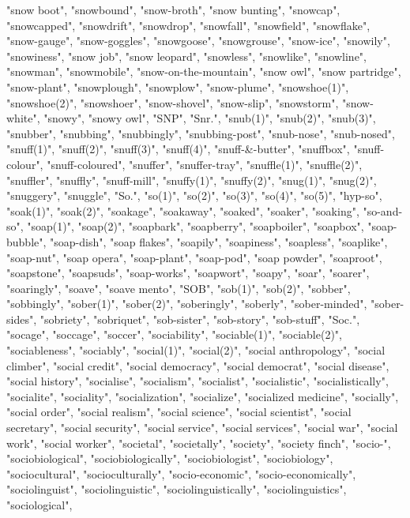 "snow boot",
"snowbound",
"snow-broth",
"snow bunting",
"snowcap",
"snowcapped",
"snowdrift",
"snowdrop",
"snowfall",
"snowfield",
"snowflake",
"snow-gauge",
"snow-goggles",
"snowgoose",
"snowgrouse",
"snow-ice",
"snowily",
"snowiness",
"snow job",
"snow leopard",
"snowless",
"snowlike",
"snowline",
"snowman",
"snowmobile",
"snow-on-the-mountain",
"snow owl",
"snow partridge",
"snow-plant",
"snowplough",
"snowplow",
"snow-plume",
"snowshoe(1)",
"snowshoe(2)",
"snowshoer",
"snow-shovel",
"snow-slip",
"snowstorm",
"snow-white",
"snowy",
"snowy owl",
"SNP",
"Snr.",
"snub(1)",
"snub(2)",
"snub(3)",
"snubber",
"snubbing",
"snubbingly",
"snubbing-post",
"snub-nose",
"snub-nosed",
"snuff(1)",
"snuff(2)",
"snuff(3)",
"snuff(4)",
"snuff-\&-butter",
"snuffbox",
"snuff-colour",
"snuff-coloured",
"snuffer",
"snuffer-tray",
"snuffle(1)",
"snuffle(2)",
"snuffler",
"snuffly",
"snuff-mill",
"snuffy(1)",
"snuffy(2)",
"snug(1)",
"snug(2)",
"snuggery",
"snuggle",
"So.",
"so(1)",
"so(2)",
"so(3)",
"so(4)",
"so(5)",
"hyp-so",
"soak(1)",
"soak(2)",
"soakage",
"soakaway",
"soaked",
"soaker",
"soaking",
"so-and-so",
"soap(1)",
"soap(2)",
"soapbark",
"soapberry",
"soapboiler",
"soapbox",
"soap-bubble",
"soap-dish",
"soap flakes",
"soapily",
"soapiness",
"soapless",
"soaplike",
"soap-nut",
"soap opera",
"soap-plant",
"soap-pod",
"soap powder",
"soaproot",
"soapstone",
"soapsuds",
"soap-works",
"soapwort",
"soapy",
"soar",
"soarer",
"soaringly",
"soave",
"soave mento",
"SOB",
"sob(1)",
"sob(2)",
"sobber",
"sobbingly",
"sober(1)",
"sober(2)",
"soberingly",
"soberly",
"sober-minded",
"sober-sides",
"sobriety",
"sobriquet",
"sob-sister",
"sob-story",
"sob-stuff",
"Soc.",
"socage",
"soccage",
"soccer",
"sociability",
"sociable(1)",
"sociable(2)",
"sociableness",
"sociably",
"social(1)",
"social(2)",
"social anthropology",
"social climber",
"social credit",
"social democracy",
"social democrat",
"social disease",
"social history",
"socialise",
"socialism",
"socialist",
"socialistic",
"socialistically",
"socialite",
"sociality",
"socialization",
"socialize",
"socialized medicine",
"socially",
"social order",
"social realism",
"social science",
"social scientist",
"social secretary",
"social security",
"social service",
"social services",
"social war",
"social work",
"social worker",
"societal",
"societally",
"society",
"society finch",
"socio-",
"sociobiological",
"sociobiologically",
"sociobiologist",
"sociobiology",
"sociocultural",
"socioculturally",
"socio-economic",
"socio-economically",
"sociolinguist",
"sociolinguistic",
"sociolinguistically",
"sociolinguistics",
"sociological",
